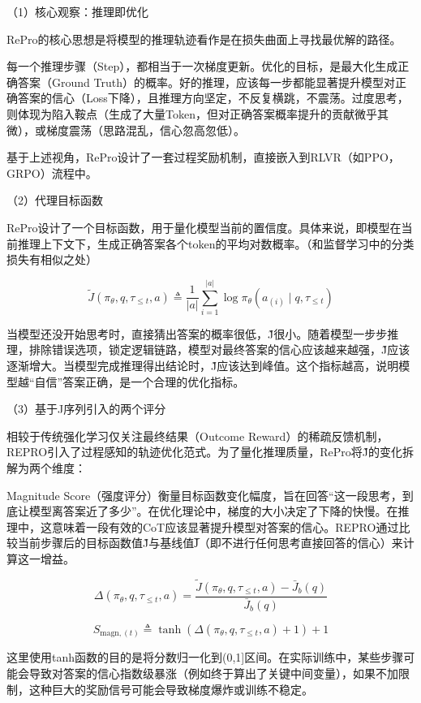 （1）核心观察：推理即优化

RePro的核心思想是将模型的推理轨迹看作是在损失曲面上寻找最优解的路径。

每一个推理步骤（Step），都相当于一次梯度更新。优化的目标，是最大化生成正确答案（Ground Truth）的概率。好的推理，应该每一步都能显著提升模型对正确答案的信心（Loss下降），且推理方向坚定，不反复横跳，不震荡。过度思考，则体现为陷入鞍点（生成了大量Token，但对正确答案概率提升的贡献微乎其微），或梯度震荡（思路混乱，信心忽高忽低）。

基于上述视角，RePro设计了一套过程奖励机制，直接嵌入到RLVR（如PPO，GRPO）流程中。

（2）代理目标函数

RePro设计了一个目标函数，用于量化模型当前的置信度。具体来说，即模型在当前推理上下文下，生成正确答案各个token的平均对数概率。（和监督学习中的分类损失有相似之处）

\[
\tilde{J}(\pi_\theta, q, \tau_{\le t}, a)
\triangleq
\frac{1}{|a|}\sum_{i=1}^{|a|}
\log \pi_\theta(a_{(i)} \mid q, \tau_{\le t})
\]

当模型还没开始思考时，直接猜出答案的概率很低，J̃很小。随着模型一步步推理，排除错误选项，锁定逻辑链路，模型对最终答案的信心应该越来越强，J̃应该逐渐增大。当模型完成推理得出结论时，J̃应该达到峰值。这个指标越高，说明模型越``自信''答案正确，是一个合理的优化指标。

（3）基于J序列引入的两个评分

相较于传统强化学习仅关注最终结果（Outcome Reward）的稀疏反馈机制，REPRO引入了过程感知的轨迹优化范式。为了量化推理质量，RePro将J̃的变化拆解为两个维度：

Magnitude Score（强度评分）衡量目标函数变化幅度，旨在回答``这一段思考，到底让模型离答案近了多少''。在优化理论中，梯度的大小决定了下降的快慢。在推理中，这意味着一段有效的CoT应该显著提升模型对答案的信心。REPRO通过比较当前步骤后的目标函数值J̃与基线值J̅（即不进行任何思考直接回答的信心）来计算这一增益。

\[
\Delta(\pi_\theta, q, \tau_{\le t}, a)
=
\frac{
\tilde{J}(\pi_\theta, q, \tau_{\le t}, a) - \bar{J}_b(q)
}{
\bar{J}_b(q)
}
\]

\[
S_{\mathrm{magn},(t)}
\triangleq
\tanh\left(\Delta(\pi_\theta, q, \tau_{\le t}, a) + 1\right) + 1
\]

这里使用tanh函数的目的是将分数归一化到(0,1{]}区间。在实际训练中，某些步骤可能会导致对答案的信心指数级暴涨（例如终于算出了关键中间变量），如果不加限制，这种巨大的奖励信号可能会导致梯度爆炸或训练不稳定。

